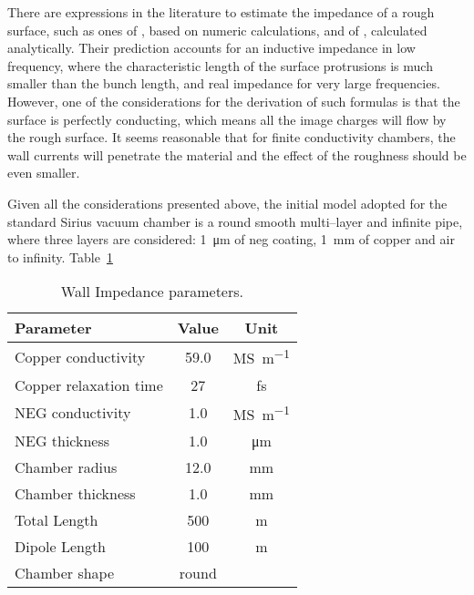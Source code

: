     There are expressions in the literature to estimate the impedance of a rough surface, such as ones of , based on numeric calculations, and of , calculated analytically. Their prediction accounts for an inductive impedance in low frequency, where the characteristic length of the surface protrusions is much smaller than the bunch length, and real impedance for very large frequencies. However, one of the considerations for the derivation of such formulas is that the surface is perfectly conducting, which means all the image charges will flow by the rough surface. It seems reasonable that for finite conductivity chambers, the wall currents will penetrate the material and the effect of the roughness should be even smaller.

    Given all the considerations presented above, the initial model adopted for the standard Sirius vacuum chamber is a round smooth multi--layer and infinite pipe, where three layers are considered: \SI{1}{\micro\meter} of \gls{neg} coating, \SI{1}{\milli\meter} of copper and air to infinity. Table~\ref{tab:wall_impedance_parameters}
    \begin{table}[b]
        \centering
        \caption{Wall Impedance parameters.}
        \label{tab:wall_impedance_parameters}
        \begin{tabular}{lcc}
            \toprule
            Parameter              &   Value    & Unit \\
            \midrule
            Copper conductivity    &   59.0     & \si{\mega\siemens\per\meter}\\
            Copper relaxation time &   27       & \si{\femto\second}\\
            NEG conductivity       &   1.0      & \si{\mega\siemens\per\meter}\\
            NEG thickness          &   1.0      & \si{\micro\meter}\\
            Chamber radius         &  12.0      & \si{\milli\meter}\\
            Chamber thickness      &   1.0      & \si{\milli\meter}\\
            Total Length           &  500       & \si{\meter}\\
            Dipole Length          &  100       & \si{\meter}\\
            Chamber shape          & round      & \\
            \bottomrule
        \end{tabular}
    \end{table}
